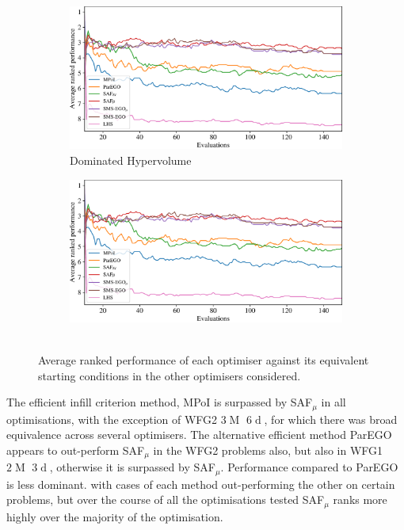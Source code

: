 \documentclass[conference]{IEEEtran}
\DeclareMathOperator*{\ndim}{d}
\DeclareMathOperator*{\nobj}{M}
\DeclareMathOperator*{\igdp}{IGD^{+}}
\newcommand\hpv{Dominated Hypervolume\xspace}
\newcommand\safmu{SAF$_{\mu}$\xspace}
\newcommand\parego{ParEGO\xspace}
\newcommand\mpoi{MPoI\xspace}
\begin{document}
\begin{figure}[t]
\begin{subfigure}[b]{\columnwidth}
         \centering
         \includegraphics[width=\columnwidth]{figures/_ranked_performance_plot_hv.pdf}
         \caption{\hpv}
     \end{subfigure}
\begin{subfigure}[b]{\columnwidth}
         \centering
         \includegraphics[width=\columnwidth]{figures/_ranked_performance_plot_igd.pdf}
         \caption{$\igdp$}
     \end{subfigure}
\caption{Average ranked performance of each optimiser against its equivalent starting conditions in the other optimisers considered.}
\label{fig: ranked_plots}
\end{figure}

The efficient infill criterion method, \mpoi is surpassed by \safmu in all optimisations, with the exception of WFG2 3$\nobj$ 6$\ndim$, for which there was broad equivalence across several optimisers. The alternative efficient method \parego appears to out-perform \safmu in the WFG2 problems also, but also in WFG1 $2\nobj$ $3\ndim$, otherwise it is surpassed by \safmu. Performance compared to \parego is less dominant. with cases of each method out-performing the other on certain problems, but over the course of all the optimisations tested \safmu ranks more highly over the majority of the optimisation. 
\end{document}
